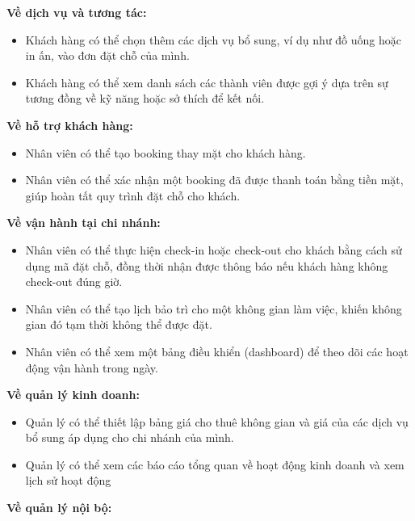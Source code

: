 \textbf{Về dịch vụ và tương tác:}

\begin{itemize}
    \item Khách hàng có thể chọn thêm các dịch vụ bổ sung, ví dụ như đồ uống hoặc in ấn, vào đơn đặt chỗ của mình.
    \item Khách hàng có thể xem danh sách các thành viên được gợi ý dựa trên sự tương đồng về kỹ năng hoặc sở thích để kết nối.
\end{itemize}


\textbf{Về hỗ trợ khách hàng:}

\begin{itemize}
    \item Nhân viên có thể tạo booking thay mặt cho khách hàng.
    \item Nhân viên có thể xác nhận một booking đã được thanh toán bằng tiền mặt, giúp hoàn tất quy trình đặt chỗ cho khách.
\end{itemize}

\textbf{Về vận hành tại chi nhánh:}

\begin{itemize}
    \item Nhân viên có thể thực hiện check-in hoặc check-out cho khách bằng cách sử dụng mã đặt chỗ, đồng thời nhận được thông báo nếu khách hàng không check-out đúng giờ.
    \item Nhân viên có thể tạo lịch bảo trì cho một không gian làm việc, khiến không gian đó tạm thời không thể được đặt.
    \item Nhân viên có thể xem một bảng điều khiển (dashboard) để theo dõi các hoạt động vận hành trong ngày.
\end{itemize}


\textbf{Về quản lý kinh doanh:}

\begin{itemize}
    \item Quản lý có thể thiết lập bảng giá cho thuê không gian và giá của các dịch vụ bổ sung áp dụng cho chi nhánh của mình.
    \item Quản lý có thể xem các báo cáo tổng quan về hoạt động kinh doanh và xem lịch sử hoạt động 
\end{itemize}

\textbf{Về quản lý nội bộ:}

